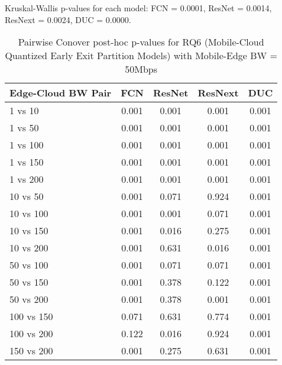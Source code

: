 \begin{table}[h]
\centering
\caption{Pairwise Conover post-hoc p-values for RQ6 (Mobile-Cloud Quantized Early Exit Partition Models) with Mobile-Edge BW = 50Mbps}
\label{tab:conover_mobile_cloud_quantized_earlyexit_partition_me50}
\smallskip
Kruskal-Wallis p-values for each model: FCN = 0.0001, ResNet = 0.0014, ResNext = 0.0024, DUC = 0.0000.

\begin{tabular}{lcccc}
\toprule
Edge-Cloud BW Pair & FCN & ResNet & ResNext & DUC \\
\midrule
1 vs 10 & 0.001 & 0.001 & 0.001 & 0.001 \\
1 vs 50 & 0.001 & 0.001 & 0.001 & 0.001 \\
1 vs 100 & 0.001 & 0.001 & 0.001 & 0.001 \\
1 vs 150 & 0.001 & 0.001 & 0.001 & 0.001 \\
1 vs 200 & 0.001 & 0.001 & 0.001 & 0.001 \\
10 vs 50 & 0.001 & 0.071 & 0.924 & 0.001 \\
10 vs 100 & 0.001 & 0.001 & 0.071 & 0.001 \\
10 vs 150 & 0.001 & 0.016 & 0.275 & 0.001 \\
10 vs 200 & 0.001 & 0.631 & 0.016 & 0.001 \\
50 vs 100 & 0.001 & 0.071 & 0.071 & 0.001 \\
50 vs 150 & 0.001 & 0.378 & 0.122 & 0.001 \\
50 vs 200 & 0.001 & 0.378 & 0.001 & 0.001 \\
100 vs 150 & 0.071 & 0.631 & 0.774 & 0.001 \\
100 vs 200 & 0.122 & 0.016 & 0.924 & 0.001 \\
150 vs 200 & 0.001 & 0.275 & 0.631 & 0.001 \\
\bottomrule
\end{tabular}
\end{table}

